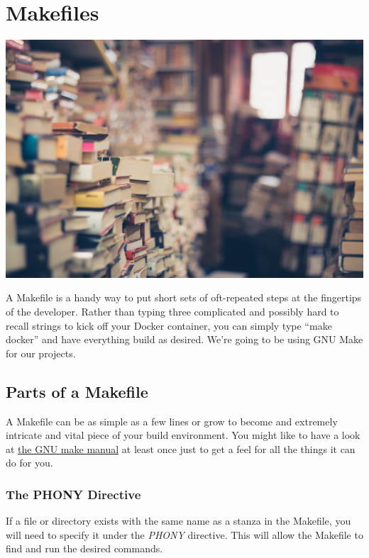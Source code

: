 \chapter{Makefiles}

\includegraphics[scale=0.20]{images/books-1163695_1920.jpg}

\justify{}
A Makefile is a handy way to put short sets of oft-repeated steps at the fingertips of the developer. Rather than
typing three complicated and possibly hard to recall strings to kick off your Docker container, you can simply type ``make docker'' and
have everything build as desired. We're going to be using GNU Make for our projects. 

\section{Parts of a Makefile}

A Makefile can be as simple as a few lines or grow to become and extremely intricate and vital piece of your build environment. 
You might like to have a look at \href{https://www.gnu.org/software/make/manual/make.html}{the GNU make manual} at least once
just to get a feel for all the things it can do for you.

\subsection{The PHONY Directive}

\justify{}
If a file or directory exists with the same name as a stanza in the Makefile, you will need to specify it under the \emph{PHONY} directive.
This will allow the Makefile to find and run the desired commands.

